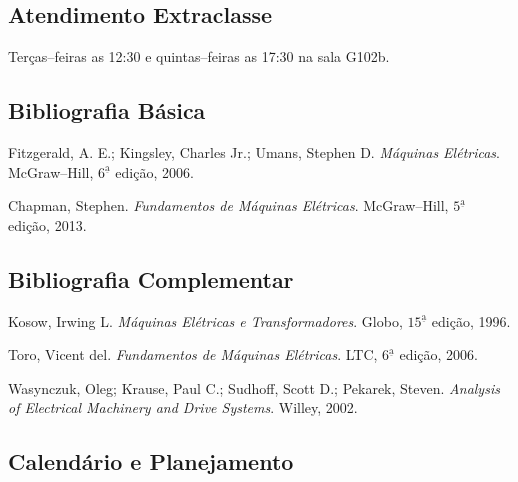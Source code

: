\documentclass[10pt, a4paper]{article}
\begin{document}

    \subsection*{Atendimento Extraclasse}
    Terças--feiras as 12:30 e quintas--feiras as 17:30 na sala G102b.

    \subsection*{Bibliografia Básica}
    \begin{enumerate}[label={[}\arabic*{]}, leftmargin=*, itemsep=-0mm]
    \item Fitzgerald, A. E.; Kingsley, Charles Jr.; Umans, Stephen D. \emph{Máquinas Elétricas}. McGraw–Hill, $6^{\underline{\text{a}}}$ edição, 2006.
    \item Chapman, Stephen. \emph{Fundamentos de Máquinas Elétricas}. McGraw–Hill, $5^{\underline{\text{a}}}$ edição, 2013.
    \end{enumerate}

    \subsection*{Bibliografia Complementar}
    \begin{enumerate}[label={[}\arabic*{]}, resume, leftmargin=*, itemsep=0mm]
    \item Kosow, Irwing L. \emph{Máquinas Elétricas e Transformadores}. Globo, $15^{\underline{\text{a}}}$ edição, 1996.
    \item Toro, Vicent del. \emph{Fundamentos de Máquinas Elétricas}. LTC, $6^{\underline{\text{a}}}$ edição, 2006.
    \item Wasynczuk, Oleg; Krause, Paul C.; Sudhoff, Scott D.; Pekarek, Steven. \emph{Analysis of Electrical
Machinery and Drive Systems}. Willey, 2002.
    \end{enumerate}

    \subsection*{Calendário e Planejamento}

    \newcommand{\feriado}[1]{\color{red!80}\sout{#1}}
    \newcommand{\anp}[1]{\color{RoyalBlue}#1}
    \newcommand{\pratica}[1]{\color{teal}#1}
    \newcommand{\prova}[1]{\color{Purple}#1}
    \newcommand{\extra}[1]{\color{Bittersweet}#1}
    \newcommand{\seminario}[1]{\color{Rhodamine}#1}

    
\end{document}

